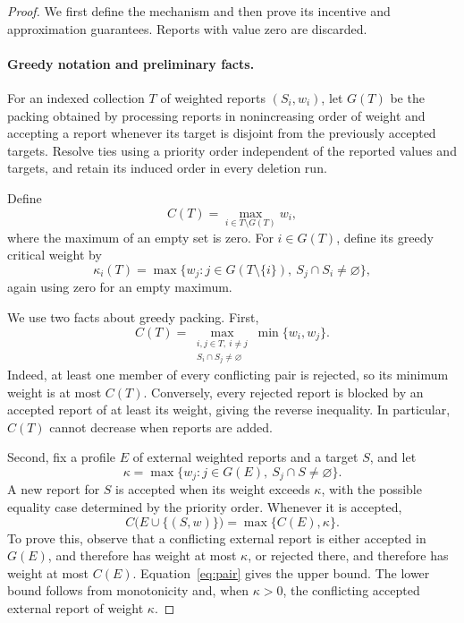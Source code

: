 \documentclass[format=acmsmall, review=false]{acmart}
\begin{document}
\begin{proof}
We first define the mechanism and then prove its incentive and
approximation guarantees. Reports with value zero are discarded.

\paragraph{Greedy notation and preliminary facts.}

For an indexed collection \(T\) of weighted reports
\((S_i,w_i)\), let \(G(T)\) be the packing obtained by processing
reports in nonincreasing order of weight and accepting a report
whenever its target is disjoint from the previously
accepted targets. Resolve ties using a priority order independent
of the reported values and targets, and retain its induced
order in every deletion run.

Define
\[
C(T)=\max_{i\in T\setminus G(T)}w_i,
\]
where the maximum of an empty set is zero. For \(i\in G(T)\),
define its greedy critical weight by
\[
\kappa_i(T)=
\max\bigl\{
w_j:j\in G(T\setminus\{i\}),\
S_j\cap S_i\ne\varnothing
\bigr\},
\]
again using zero for an empty maximum.

We use two facts about greedy packing. First,
\begin{equation}\label{eq:pair}
C(T)=
\max_{\substack{i,j\in T,\ i\ne j\\
                 S_i\cap S_j\ne\varnothing}}
\min\{w_i,w_j\}.
\end{equation}
Indeed, at least one member of every conflicting pair is
rejected, so its minimum weight is at most \(C(T)\).
Conversely, every rejected report is blocked by an accepted report
of at least its weight, giving the reverse inequality.
In particular, \(C(T)\) cannot decrease when reports are added.

Second, fix a profile \(E\) of external weighted reports and a
target \(S\), and let
\[
\kappa=\max\{w_j:j\in G(E),\ S_j\cap S\ne\varnothing\}.
\]
A new report for \(S\) is accepted when its weight exceeds
\(\kappa\), with the possible equality case determined by the
priority order. Whenever it is accepted,
\begin{equation}\label{eq:normalizer}
C\bigl(E\cup\{(S,w)\}\bigr)=\max\{C(E),\kappa\}.
\end{equation}
To prove this, observe that a conflicting external report is
either accepted in \(G(E)\), and therefore has weight at most
\(\kappa\), or rejected there, and therefore has weight at most
\(C(E)\). Equation~\eqref{eq:pair} gives the upper bound.
The lower bound follows from monotonicity and, when \(\kappa>0\),
the conflicting accepted external report of weight \(\kappa\).


\end{proof}
\end{document}

